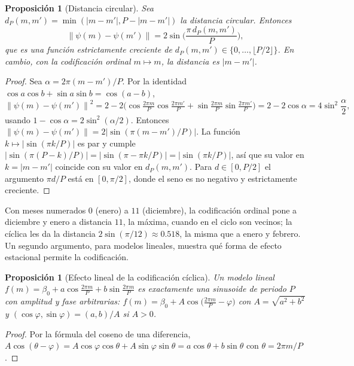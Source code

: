 \documentclass[11pt]{article}
\newtheorem{proposicion}[teorema]{Proposición}
\theoremstyle{definition}
\theoremstyle{remark}
\newcommand{\norm}[1]{\left\lVert #1\right\rVert}
\newcommand{\abs}[1]{\left\lvert #1\right\rvert}
\begin{document}
\begin{proposicion}[Distancia circular]\label{prop:ciclica}
\noindent Sea $d_P(m,m')=\min(\abs{m-m'},P-\abs{m-m'})$ la distancia circular. Entonces
\[
\norm{\psi(m)-\psi(m')}=2\sin\Big(\frac{\pi\,d_P(m,m')}{P}\Big),
\]
que es una función estrictamente creciente de $d_P(m,m')\in\{0,\dots,\lfloor P/2\rfloor\}$. En cambio, con la codificación ordinal $m\mapsto m$, la distancia es $\abs{m-m'}$.
\end{proposicion}
\begin{proof}
\noindent Sea $\alpha=2\pi(m-m')/P$. Por la identidad $\cos a\cos b+\sin a\sin b=\cos(a-b)$,
\[
\norm{\psi(m)-\psi(m')}^2=2-2\Big(\cos\tfrac{2\pi m}{P}\cos\tfrac{2\pi m'}{P}+\sin\tfrac{2\pi m}{P}\sin\tfrac{2\pi m'}{P}\Big)=2-2\cos\alpha=4\sin^2\frac\alpha2,
\]
usando $1-\cos\alpha=2\sin^2(\alpha/2)$. Entonces $\norm{\psi(m)-\psi(m')}=2\abs{\sin(\pi(m-m')/P)}$. La función $k\mapsto\abs{\sin(\pi k/P)}$ es par y cumple $\abs{\sin(\pi(P-k)/P)}=\abs{\sin(\pi-\pi k/P)}=\abs{\sin(\pi k/P)}$, así que su valor en $k=\abs{m-m'}$ coincide con su valor en $d_P(m,m')$. Para $d\in[0,P/2]$ el argumento $\pi d/P$ está en $[0,\pi/2]$, donde el seno es no negativo y estrictamente creciente.
\end{proof}

\noindent Con meses numerados $0$ (enero) a $11$ (diciembre), la codificación ordinal pone a diciembre y enero a distancia $11$, la máxima, cuando en el ciclo son vecinos; la cíclica les da la distancia $2\sin(\pi/12)\approx0.518$, la misma que a enero y febrero. Un segundo argumento, para modelos lineales, muestra qué forma de efecto estacional permite la codificación.

\begin{proposicion}[Efecto lineal de la codificación cíclica]\label{prop:armonico}
\noindent Un modelo lineal $f(m)=\beta_0+a\cos\frac{2\pi m}P+b\sin\frac{2\pi m}P$ es exactamente una sinusoide de periodo $P$ con amplitud y fase arbitrarias: $f(m)=\beta_0+A\cos\big(\frac{2\pi m}{P}-\varphi\big)$ con $A=\sqrt{a^2+b^2}$ y $(\cos\varphi,\sin\varphi)=(a,b)/A$ si $A>0$.
\end{proposicion}
\begin{proof}
\noindent Por la fórmula del coseno de una diferencia, $A\cos(\theta-\varphi)=A\cos\varphi\cos\theta+A\sin\varphi\sin\theta=a\cos\theta+b\sin\theta$ con $\theta=2\pi m/P$.
\end{proof}
\end{document}
